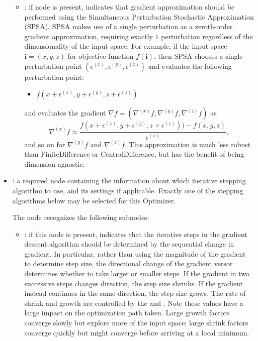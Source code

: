\begin{itemize}
\begin{itemize}
        \item {}:
          if node is present, indicates that gradient approximation should be performed
          using the Simultaneous Perturbation Stochastic Approximation (SPSA).         SPSA makes
          use of a single perturbation as a zeroth-order gradient approximation,         requiring
          exactly $1$         perturbation regardless of the dimensionality of the input space. For
          example, if the input space         $\mathbf{i} = (x, y, z)$ for objective function
          $f(\mathbf{i})$, then SPSA chooses         a single perturbation point $(\epsilon^{(x)},
          \epsilon^{(y)}, \epsilon^{(z)})$ and evaluates         the following perturbation point:
          \begin{itemize}           \item $f(x+\epsilon^{(x)}, y+\epsilon^{(y)}, z+\epsilon^{(z)})$
          \end{itemize}         and evaluates the gradient $\nabla f = (\nabla^{(x)} f, \nabla^{(y)}
          f, \nabla^{(z)} f)$ as         \begin{equation*}           \nabla^{(x)}f \approx
          \frac{f(x+\epsilon^{(x)}, y+\epsilon^{(y)}, z+\epsilon^{(z)})) -               f(x, y,
          z)}{\epsilon^{(x)}},         \end{equation*}         and so on for $ \nabla^{(y)}f$ and
          $\nabla^{(z)}f$. This approximation is much less robust         than FiniteDifference or
          CentralDifference, but has the benefit of being dimension agnostic.
      \end{itemize}

    \item {}:
      a required node containing the information about which iterative stepping algorithm to
      use, and its settings if applicable. Exactly one of the stepping algorithms
      below may be selected for this Optimizer.

      The  node recognizes the following subnodes:
      \begin{itemize}
        \item {}:
          if this node is present, indicates that the iterative steps in the gradient
          descent algorithm should be determined by the sequential change in gradient. In
          particular, rather         than using the magnitude of the gradient to determine step
          size, the directional change of the         gradient versor determines whether to take
          larger or smaller steps. If the gradient in two successive         steps changes
          direction, the step size shrinks. If the gradient instead continues in the same
          direction, the step size grows. The rate of shrink and growth are controlled by the
                   and . Note these values have a large
          impact on the optimization path taken.         Large growth factors converge slowly but
          explore more of the input space; large shrink factors         converge quickly but might
          converge before arriving at a local minimum.


\end{itemize}
\end{itemize}

